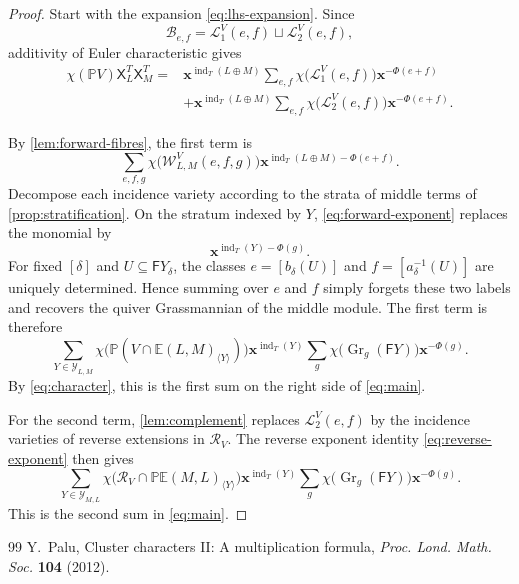 \documentclass[10pt,a4paper]{amsart}
\numberwithin{equation}{section}
\theoremstyle{definition}
\DeclareMathOperator{\Gr}{Gr}
\DeclareMathOperator{\ind}{ind}
\newcommand{\E}{\mathbb E}
\newcommand{\F}{\mathsf F}
\newcommand{\X}{\mathsf X}
\newcommand{\bx}{\mathbf x}
\begin{document}
\setcounter{section}{3}
\setcounter{equation}{8}
\setcounter{theorem}{9}
\begin{proof}
Start with the expansion \eqref{eq:lhs-expansion}.  Since
\[
 \mathcal B_{e,f}=\mathcal L^V_1(e,f)\sqcup\mathcal L^V_2(e,f),
\]
additivity of Euler characteristic gives
\begin{align*}
 \chi(\mathbb PV)\X^T_L\X^T_M
 ={}&\bx^{\ind_T(L\oplus M)}
 \sum_{e,f}\chi\bigl(\mathcal L^V_1(e,f)\bigr)\bx^{-\Phi(e+f)}\\
 &+\bx^{\ind_T(L\oplus M)}
 \sum_{e,f}\chi\bigl(\mathcal L^V_2(e,f)\bigr)\bx^{-\Phi(e+f)}.
\end{align*}

By \cref{lem:forward-fibres}, the first term is
\[
 \sum_{e,f,g}\chi\bigl(\mathcal W^V_{L,M}(e,f,g)\bigr)
 \bx^{\ind_T(L\oplus M)-\Phi(e+f)}.
\]
Decompose each incidence variety according to the strata of middle terms of \cref{prop:stratification}.  On the stratum indexed by $Y$, \eqref{eq:forward-exponent} replaces the monomial by
\[
 \bx^{\ind_T(Y)-\Phi(g)}.
\]
For fixed $[\delta]$ and $U\subseteq\F Y_\delta$, the classes $e=[b_\delta(U)]$ and $f=[a_\delta^{-1}(U)]$ are uniquely determined.  Hence summing over $e$ and $f$ simply forgets these two labels and recovers the quiver Grassmannian of the middle module.  The first term is therefore
\[
 \sum_{Y\in\mathcal Y_{L,M}}
 \chi\bigl(\mathbb P(V\cap\E(L,M)_{\langle Y\rangle})\bigr)
 \bx^{\ind_T(Y)}
 \sum_g\chi\bigl(\Gr_g(\F Y)\bigr)\bx^{-\Phi(g)}.
\]
By \eqref{eq:character}, this is the first sum on the right side of \eqref{eq:main}.

For the second term, \cref{lem:complement} replaces
$\mathcal L^V_2(e,f)$ by the incidence varieties of reverse extensions in $\mathcal R_V$.  The reverse exponent identity \eqref{eq:reverse-exponent} then gives
\[
 \sum_{Y\in\mathcal Y_{M,L}}
 \chi\bigl(\mathcal R_V\cap
   \mathbb P\E(M,L)_{\langle Y\rangle}\bigr)
 \bx^{\ind_T(Y)}
 \sum_g\chi\bigl(\Gr_g(\F Y)\bigr)\bx^{-\Phi(g)}.
\]
This is the second sum in \eqref{eq:main}.
\end{proof}

\begin{thebibliography}{99}
 Y.~Palu, Cluster characters II: A multiplication formula, \emph{Proc. Lond. Math. Soc.} \textbf{104} (2012).
\end{thebibliography}
\end{document}
